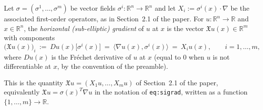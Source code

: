 \begin{definition}
Let $\sigma=(\sigma^1,\dots,\sigma^m)$ be vector fields $\sigma^i:\mathbb{R}^n\to\mathbb{R}^n$ and
let $X_i:=\sigma^i(x)\cdot\nabla$ be the associated first-order operators, as in Section~2.1 of the
paper. For $u:\mathbb{R}^n\to\mathbb{R}$ and $x\in\mathbb{R}^n$, the \emph{horizontal
(sub-elliptic) gradient} of $u$ at $x$ is the vector $\mathfrak{X}u(x)\in\mathbb{R}^m$ with
components
$$\big(\mathfrak{X}u(x)\big)_i\ :=\ Du(x)\big[\sigma^i(x)\big]\ =\ \big\langle\nabla
u(x),\sigma^i(x)\big\rangle\ =\ X_iu(x),\qquad i=1,\dots,m,$$
where $Du(x)$ is the Fr\'echet derivative of $u$ at $x$ (equal to $0$ when $u$ is not
differentiable at $x$, by the convention of the preamble).

This is the quantity $\mathfrak{X}u=(X_1u,\dots,X_mu)$ of Section~2.1 of the paper, equivalently
$\mathfrak{X}u=\sigma(x)^T\nabla u$ in the notation of \texttt{eq:sigrad}, written as a function
$\{1,\dots,m\}\to\mathbb{R}$.
\end{definition}
